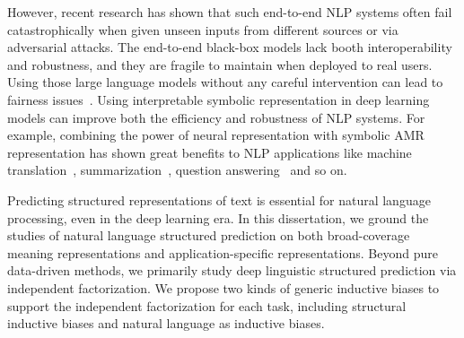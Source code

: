 However, recent research has shown that such end-to-end NLP systems
often fail catastrophically when given unseen inputs from different
sources or via adversarial attacks. The end-to-end black-box models
lack booth interoperability and robustness, and they are fragile to maintain
when deployed to real users. Using those large language models without
any careful intervention can lead to fairness
issues~\citep{bommasani2021opportunities}.  Using interpretable
symbolic representation in deep learning models can improve both the
efficiency and robustness of NLP systems. For example, combining the
power of neural representation with symbolic AMR representation has
shown great benefits to NLP applications like machine
translation~\citep{song2019semantic},
summarization~\citep{liu2015toward}, question
answering~\citep{kapanipathi2021leveraging} and so on.

Predicting structured representations of text is essential for natural
language processing, even in the deep learning era. In this dissertation, we
ground the studies of natural language structured prediction on both
broad-coverage meaning representations and application-specific
representations. Beyond pure data-driven methods, we primarily study
deep linguistic structured prediction via independent
factorization. We propose two kinds of generic inductive biases to
support the independent factorization for each task, including
structural inductive biases and natural language as inductive biases.


%





